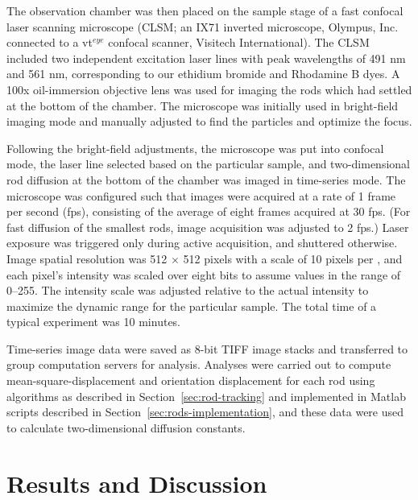 The observation chamber was then placed on the sample stage of a fast confocal laser scanning microscope (CLSM; 
an IX71 inverted microscope, Olympus, Inc. connected to a vt$^{eye}$ confocal scanner, Visitech International). The CLSM
included two independent excitation laser lines with peak wavelengths of 491 nm and 561 nm, corresponding to our ethidium 
bromide and Rhodamine B dyes.  A 100x oil-immersion objective lens was used for imaging the rods which had settled at the bottom
of the chamber.  The microscope was initially used in bright-field imaging mode and manually adjusted to find the particles and 
optimize the focus.

Following the bright-field adjustments, the microscope was put into confocal mode, the laser line selected 
based on the particular sample, and two-dimensional rod diffusion at the 
bottom of the chamber was imaged in time-series mode.  The microscope was configured such that images were acquired at
a rate of 1 frame per second (fps), consisting of the average of eight frames acquired at 30 fps.  
(For fast diffusion of the smallest rods,
image acquisition was adjusted to 2 fps.)  Laser exposure was triggered only during active 
acquisition, and shuttered otherwise.  Image spatial resolution was 512 $\times$ 512 pixels with a scale of 10 pixels
per \microns, and each pixel's intensity was scaled over eight bits to assume values in the range of 0--255.
The intensity scale was adjusted relative to the actual intensity to maximize the dynamic range for the particular sample.
The total time of a typical experiment was 10 minutes.

Time-series image data were saved as 8-bit TIFF image stacks and transferred to group computation servers for analysis.
Analyses were carried out to compute mean-square-displacement and orientation displacement for each rod using algorithms as 
described in Section~\ref{sec:rod-tracking} and implemented in Matlab scripts described in Section~\ref{sec:rods-implementation}, 
and these data
were used to calculate two-dimensional diffusion constants.  



\begin{itemize}
\end{itemize}

\section{Results and Discussion}

